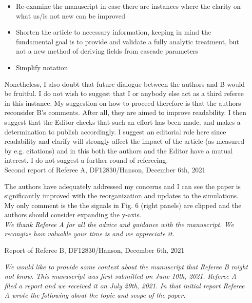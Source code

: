 \documentclass[12pt]{article}
\begin{document}
\begin{itemize}
\item Re-examine the manuscript in case there are instances where the clarity on what
us/is not new can be improved
\item Shorten the article to necessary information, keeping in mind the fundamental goal
is to provide and validate a fully analytic treatment, but not a new method of
deriving fields from cascade parameters
\item Simplify notation
\end{itemize}

Nonetheless, I also doubt that future dialogue between the authors and B would be fruitful.  I do not wish to suggest that I or anybody else act as a third referee in this instance.  My suggestion on how to proceed therefore is that the authors reconsider B’s comments.  After all, they are aimed to improve readability. I then suggest that the Editor checks that such an effort has been made, and makes a determination to publish accordingly. I suggest an editorial role here since readability and clarify will strongly affect the impact of the article (as measured by e.g. citations) and in this both the authors and the Editor have a mutual interest.  I do not suggest a further round of refereeing. \\

Second report of Referee A, DF12830/Hanson, December 6th, 2021 \\ \vspace{0.25cm}
\hrulefill

The authors have adequately addressed my concerns and I can see the paper is significantly improved with the reorganization and updates to the simulations. My only comment is the the signals in Fig. 6 (right panels) are clipped and the authors should consider expanding the y-axis. \\

\textit{We thank Referee A for all the advice and guidance with the manuscript.  We recongize how valuable your time is and we appreciate it.} \\ \vspace{0.25cm}

Report of Referee B, DF12830/Hanson, December 6th, 2021 \\ \vspace{0.25cm}
\hrulefill

\textit{We would like to provide some context about the manuscript that Referee B might not know.  This manuscript was first submitted on June 10th, 2021.  Referee A filed a report and we received it on July 29th, 2021.  In that initial report Referee A wrote the following about the topic and scope of the paper:} \\
\end{document}
